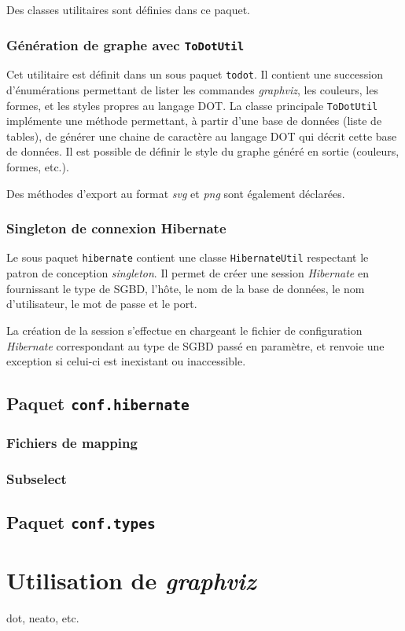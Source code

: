 Des classes utilitaires sont définies dans ce paquet.

\subsubsection{Génération de graphe avec \texttt{ToDotUtil}}
Cet utilitaire est définit dans un sous paquet \texttt{todot}. Il contient une succession d'énumérations permettant de lister les commandes \emph{graphviz}, les couleurs, les formes, et les styles propres au langage DOT.
La classe principale \texttt{ToDotUtil} implémente une méthode permettant, à partir d'une base de données (liste de tables), de générer une chaine de caractère au langage DOT qui décrit cette base de données. Il est possible de définir le style du graphe généré en sortie (couleurs, formes, etc.).

Des méthodes d'export au format \emph{svg} et \emph{png} sont également déclarées.

\subsubsection{Singleton de connexion Hibernate}
Le sous paquet \texttt{hibernate} contient une classe \texttt{HibernateUtil} respectant le patron de conception \emph{singleton}. Il permet de créer une session \emph{Hibernate} en fournissant le type de SGBD, l'hôte, le nom de la base de données, le nom d'utilisateur, le mot de passe et le port.

La création de la session s'effectue en chargeant le fichier de configuration \emph{Hibernate} correspondant au type de SGBD passé en paramètre, et renvoie une exception si celui-ci est inexistant ou inaccessible.

\subsection{Paquet \texttt{conf.hibernate}}
\subsubsection{Fichiers de mapping}
\subsubsection{Subselect}

\subsection{Paquet \texttt{conf.types}}
\label{subsection:conf.types}


\section{Utilisation de \emph{graphviz}}
dot, neato, etc.